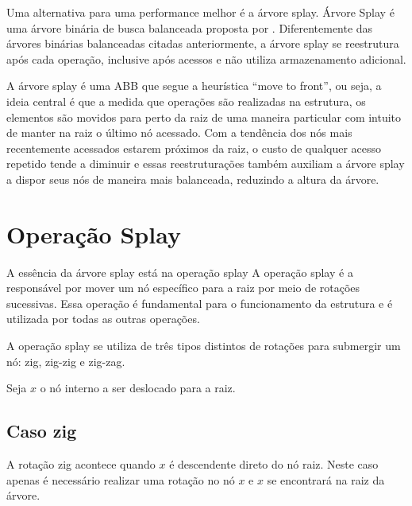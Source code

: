 Uma alternativa para uma performance melhor é a árvore splay. Árvore Splay é uma árvore binária de busca balanceada proposta por \cite{selfadjustingbst}. Diferentemente das árvores binárias balanceadas citadas anteriormente, a árvore splay se reestrutura após cada operação, inclusive após acessos e não utiliza armazenamento adicional.

A árvore splay é uma ABB que segue a heurística “move to front”, ou seja, a ideia central é que a medida que operações são realizadas na estrutura, os elementos são movidos para perto da raiz de uma maneira particular com intuito de manter na raiz o último nó acessado.
Com a tendência dos nós mais recentemente acessados estarem próximos da raiz, o custo de qualquer acesso repetido tende a diminuir e essas reestruturações também auxiliam a árvore splay a dispor seus nós de maneira mais balanceada, reduzindo a altura da árvore.

\section{Operação Splay}

A essência da árvore splay está na operação splay A operação splay é a responsável por mover um nó específico para a raiz por meio de rotações sucessivas. Essa operação é fundamental para o funcionamento da estrutura e é utilizada por todas as outras operações.

A operação splay se utiliza de três tipos distintos de rotações para submergir um nó: zig, zig-zig e zig-zag.

Seja $x$ o nó interno a ser deslocado para a raiz. 

\subsection{Caso zig}

A rotação zig acontece quando $x$ é descendente direto do nó raiz. Neste caso apenas é necessário realizar uma rotação no nó $x$ e $x$ se encontrará na raiz da árvore.



